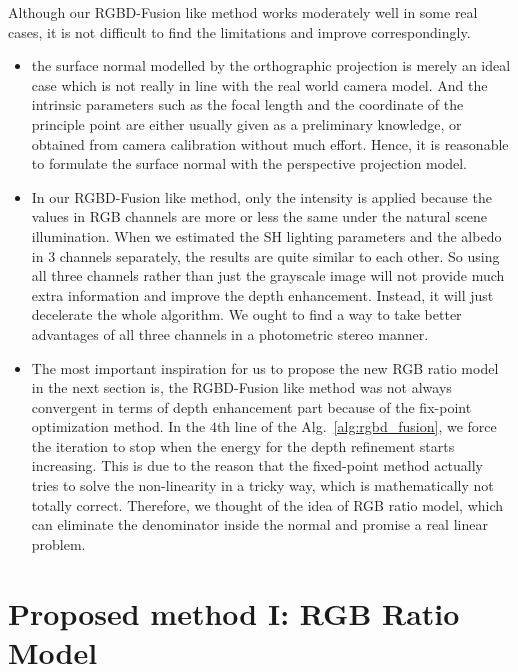 Although our RGBD-Fusion like method works moderately well in some real cases, it is not difficult to find the limitations and improve correspondingly.
\begin{itemize}
\item the surface normal modelled by the orthographic projection is merely an ideal case which is not really in line with the real world camera model.
And the intrinsic parameters such as the focal length and the coordinate of the principle point are either usually given as a preliminary knowledge, or obtained from camera calibration without much effort.
Hence, it is reasonable to formulate the surface normal with the perspective projection model.

\item In our RGBD-Fusion like method, only the intensity is applied because the values in RGB channels are more or less the same under the natural scene illumination. 
When we estimated the SH lighting parameters and the albedo in 3 channels separately, the results are quite similar to each other.
So using all three channels rather than just the grayscale image will not provide much extra information and improve the depth enhancement. 
Instead, it will just decelerate the whole algorithm.
We ought to find a way to take better advantages of all three channels in a photometric stereo manner.

\item The most important inspiration for us to propose the new RGB ratio model in the next section is, the RGBD-Fusion like method was not always convergent in terms of depth enhancement part because of the fix-point optimization method.
In the $4$th line of the Alg.~\ref{alg:rgbd_fusion}, we force the iteration to stop when the energy for the depth refinement starts increasing.
This is due to the reason that the fixed-point method actually tries to solve the non-linearity in a tricky way, which is mathematically not totally correct. 
Therefore, we thought of the idea of RGB ratio model, which can eliminate the denominator inside the normal and promise a real linear problem.

\end{itemize}


\section{Proposed method I: RGB Ratio Model}

